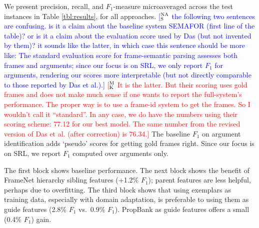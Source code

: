 \documentclass[11pt,a4paper]{article}
\newcommand{\ensuretext}[1]{#1}
\newcommand{\nssmarker}{\ensuretext{\textcolor{magenta}{\ensuremath{^{\textsc{NS}}_{\textsc{S}}}}}}
\newcommand{\mkmarker}{\ensuretext{\textcolor{red}{\ensuremath{^{\textsc{M}}_{\textsc{K}}}}}}
\newcommand{\nasmarker}{\ensuretext{\textcolor{blue}{\ensuremath{^{\textsc{NA}}_{\textsc{S}}}}}}
\newcommand{\arkcomment}[3]{\ensuretext{\textcolor{#3}{[#1 #2]}}}
\newcommand{\nss}[1]{\arkcomment{\nssmarker}{#1}{magenta}}
\newcommand{\mk}[1]{\arkcomment{\mkmarker}{#1}{red}}
\newcommand{\nascomment}[1]{\arkcomment{\nasmarker}{#1}{blue}}
\newcommand{\finalversion}[1]{}
\begin{document}



We present precision, recall, and $F_1$-measure microaveraged across the test
instances in Table \ref{tbl:results}, for all approaches. %
\nascomment{the following two sentences  are confusing.  is it a claim about
  the baseline system SEMAFOR (first line of the table)?  or is it a claim
  about the evaluation score used by Das (but not invented by them)?
  it sounds like the latter, in which case this sentence should be
  more like:  The standard evaluation score for frame-semantic parsing
assesses both frames and arguments; since our focus is on SRL, we only
report $F_1$ for arguments, rendering our scores more interpretable
(but not directly comparable to those reported by Das et al.).}
\mk{It is the latter. But their scoring uses gold frames and does not make much 
sense if one wants to report the full-system's performance. The proper
way is to use a frame-id system to get the frames. So I wouldn't call it ``standard''.
In any case, we do have the numbers using their scoring scheme: 77.12 for our best model. 
The same number from the revised version of Das et al. (after correction) is 76.34.}
The baseline $F_1$ on argument identification \citep{das-14} adds `pseudo' scores for getting gold frames right. 
Since our focus is on SRL, we report $F_1$ computed over arguments
only. 

The first block shows baseline performance.  The next block shows the
benefit of FrameNet hierarchy sibling features (+1.2\% $F_1$); parent features
are less helpful, perhaps due to overfitting.  The third block shows
that using exemplars as training data, especially with domain
adaptation, is preferable to using them as guide features (2.8\% $F_1$
vs.~0.9\% $F_1$).  PropBank
as guide features offers a small (0.4\% $F_1$) gain.









\end{document}
